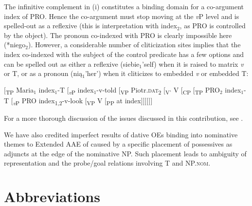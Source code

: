 \documentclass[output=paper,modfonts,nonflat
]{langsci/langscibook}
\begin{document}
{\noindent The infinitive complement in (i) constitutes a binding domain for a co-argument index of PRO. Hence the co-argument must stop moving at the \textit{v}P level and is spelled-out as a reflexive (this is interpretation with index$_2$, as PRO is controlled by the object). The pronoun co-indexed with PRO is clearly impossible here (*niego$_2$). However, a considerable number of cliticization sites implies that the index co-indexed with the subject of the control predicate has a few options and can be spelled out as either a reflexive (siebie$_1$’self) when it is raised to matrix \textit{v} or T, or as a pronoun (nią$_1$’her’) when it cliticizes to embedded \textit{v} or embedded T:


\ea
$[$\textsubscript{TP} Maria$_1$ index$_1$-T [\textsubscript{\textit{v}P} index$_1$-v-told [\textsubscript{VP} Piotr.\textsc{dat}\textsubscript{2} [\textsubscript{V’} V [\textsubscript{CP} [\textsubscript{TP} PRO$_2$ index$_1$-T [\textsubscript{\textit{v}P} PRO index\textsubscript{1,2}-v-look [\textsubscript{VP} V [\textsubscript{PP} at index$]]]]]]$
\z

\noindent For a more thorough discussion of the issues discussed in this contribution, see \cite{witkosetal_forth}.} We have also credited imperfect results of dative OEs binding into nominative themes to Extended AAE of \cite{rizzi1990} caused by a specific placement of possessives as adjuncts at the edge of the nominative NP. Such placement leads to ambiguity of representation and the probe/goal relations involving T and NP.\textsc{nom}.


%

\section*{Abbreviations}
\end{document}
